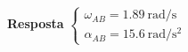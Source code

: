 \begin{flushright}
	\textbf{Resposta}
	$
	\begin{cases}
	\omega_{AB}=\SI{1.89}{\radian/\second}\\
	\alpha_{AB}=\SI{15.6}{\radian/\second^{2}}
	\end{cases}
	$
\end{flushright}